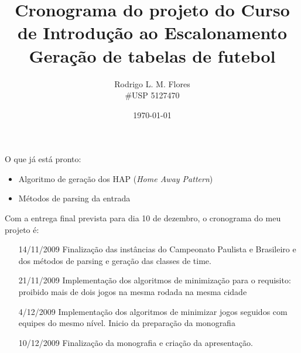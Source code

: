 \documentclass[a4paper,12pt,notitlepage]{article}
\title{Cronograma do projeto do Curso de Introdução ao Escalonamento \\ Geração de tabelas de futebol}
\author{Rodrigo L. M. Flores \\ \#USP 5127470}
\date{\today}
\begin{document}
\maketitle

O que já está pronto:

\begin{itemize}
  \item Algoritmo de geração dos HAP (\textit{Home Away Pattern})
  \item Métodos de parsing da entrada
\end{itemize}

Com a entrega final prevista para dia 10 de dezembro, o cronograma do meu projeto é:

\begin{itemize}
  
  \item[14/11/2009] Finalização das instâncias do Campeonato Paulista e Brasileiro e 
dos métodos de parsing e geração das classes de time.
  \item[21/11/2009] Implementação dos algoritmos de minimização para o requisito: 
proibido mais de dois jogos na mesma rodada na mesma cidade
  \item[4/12/2009] Implementação dos algoritmos de minimizar jogos seguidos com equipes
do mesmo nível. Inicio da preparação da monografia
  \item[10/12/2009] Finalização da monografia e criação da apresentação. 
  
\end{itemize}



\end{document}
